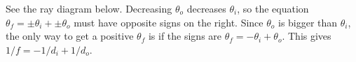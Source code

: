  See the ray diagram below. Decreasing $\theta_o$ decreases
$\theta_i$, so the equation $\theta_f=\pm\theta_i+\pm\theta_o$
must have opposite signs on the right. Since $\theta_o$ is bigger
than $\theta_i$, the only way to get a positive $\theta_f$ is if
the signs are $\theta_f=-\theta_i+\theta_o$.
This gives $1/f=-1/d_i+1/d_o$.




